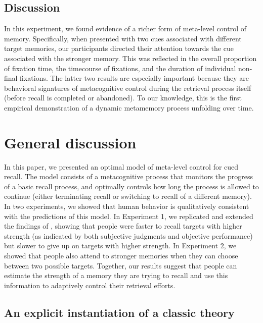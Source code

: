 
\subsection{Discussion}

In this experiment, we found evidence of a richer form of meta-level control of memory. Specifically, when presented with two cues associated with different target memories, our participants directed their attention towards the cue associated with the stronger memory. This was reflected in the overall proportion of fixation time, the timecourse of fixations, and the duration of individual non-final fixations. The latter two results are especially important because they are behavioral signatures of metacognitive control during the retrieval process itself (before recall is completed or abandoned). To our knowledge, this is the first empirical demonstration of a dynamic metamemory process unfolding over time. 

\section{General discussion}

In this paper, we presented an optimal model of meta-level control for cued recall. The model consists of a metacognitive process that monitors the progress of a basic recall process, and optimally controls how long the process is allowed to continue (either terminating recall or switching to recall of a different memory). In two experiments, we showed that human behavior is qualitatively consistent with the predictions of this model. In Experiment 1, we replicated and extended the findings of \citet{costermans1992confidence}, showing that people were faster to recall targets with higher strength (as indicated by both subjective judgments and objective performance) but slower to give up on targets with higher strength. In Experiment 2, we showed that people also attend to stronger memories when they can choose between two possible targets. Together, our results suggest that people can estimate the strength of a memory they are trying to recall and use this information to adaptively control their retrieval efforts.

\subsection{An explicit instantiation of a classic theory}

